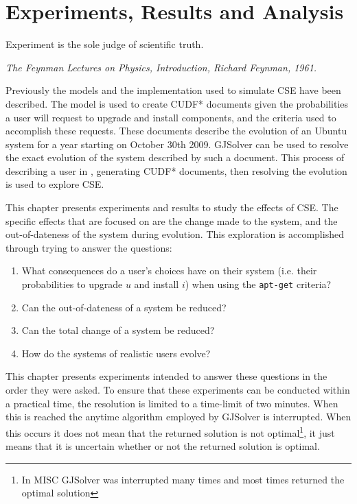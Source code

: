 
\chapter{Experiments, Results and Analysis}
\label{experiments}
\epigraph{Experiment is the sole judge of scientific truth.}
{\textit{The Feynman Lectures on Physics, Introduction, Richard Feynman, 1961.}}
Previously the models and the implementation used to simulate CSE have been described.
The \usermodel model is used to create CUDF* documents given the probabilities a user will request to upgrade and install components, 
and the criteria used to accomplish these requests.
These documents describe the evolution of an Ubuntu system for a year starting on October 30th 2009.
GJSolver can be used to resolve the exact evolution of the system described by such a document.
This process of describing a user in \usermodel, generating CUDF* documents, then resolving the evolution is used to explore CSE.

This chapter presents experiments and results to study the effects of CSE.
The specific effects that are focused on are the change made to the system, and the out-of-dateness of the system during evolution.
This exploration is accomplished through trying to answer the questions:
\begin{enumerate}
  \item What consequences do a user's choices have on their system (i.e. their probabilities to upgrade $u$ and install $i$) when using the \texttt{apt-get} criteria?
  \item Can the out-of-dateness of a system be reduced?
  \item Can the total change of a system be reduced?
  \item How do the systems of realistic users evolve?
\end{enumerate}
This chapter presents experiments intended to answer these questions in the order they were asked. 
To ensure that these experiments can be conducted within a practical time, 
the resolution is limited to a time-limit of two minutes.
When this is reached the anytime algorithm employed by GJSolver is interrupted.
When this occurs it does not mean that the returned solution is not optimal\footnote{In MISC GJSolver was interrupted many times and most times returned the optimal solution},
it just means that it is uncertain whether or not the returned solution is optimal.

